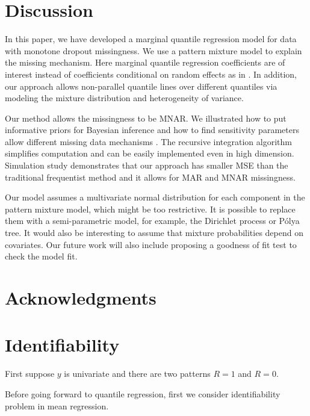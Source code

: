 \documentclass[12pt]{article}
\newcommand{\polya}{P\'{o}lya}
\begin{document}
\section{Discussion}
\label{sec:discussion}

In this paper, we have developed a marginal quantile regression model
for data with monotone dropout missingness. We use a pattern mixture
model to explain the missing mechanism. Here marginal quantile
regression coefficients are of interest instead of coefficients
conditional on random effects as in \citep{yuan2010}. In addition, our
approach allows non-parallel quantile lines over different quantiles
via modeling the mixture distribution and heterogeneity of variance.

Our method allows the missingness to be MNAR.  We illustrated how to
put informative priors for Bayesian inference and how to find
sensitivity parameters allow different missing data mechanisms .  The
recursive integration algorithm simplifies computation and can be
easily implemented even in high dimension.  Simulation study
demonstrates that our approach has smaller MSE than the traditional
frequentist method and it allows for MAR and MNAR missingness.

Our model assumes a multivariate normal distribution for each
component in the pattern mixture model, which might be too
restrictive. It is possible to replace them with a semi-parametric
model, for example, the Dirichlet process or \polya{} tree.  It would
also be interesting to assume that mixture probabilities depend on
covariates. Our future work will also include proposing a goodness of
fit test to check the model fit.

\section{Acknowledgments}



% 


\appendix
\section{Identifiability}
\label{sec:iden}
First suppose $y$ is univariate and there are two patterns $R = 1$ and
$R = 0$.

Before going forward to quantile regression, first we consider
identifiability problem in mean regression.
\end{document}
